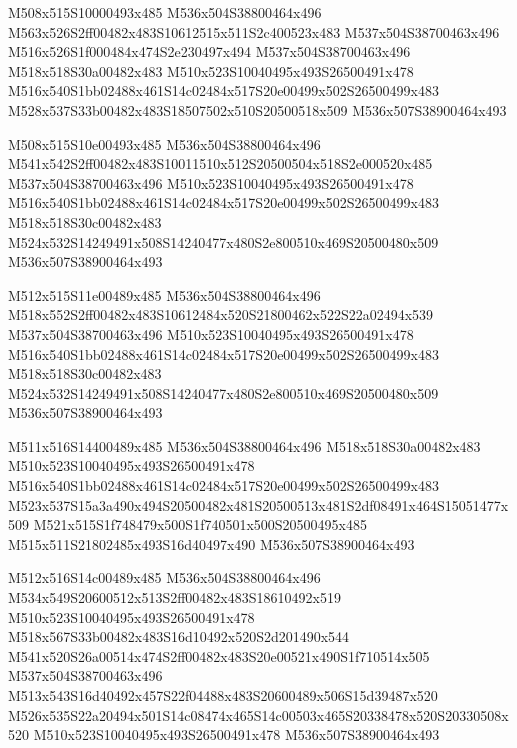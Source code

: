 \documentclass{article}
\begin{document}
\begin{multicols}{5}
\begin{center}

M508x515S10000493x485 %
M536x504S38800464x496 %
M563x526S2ff00482x483S10612515x511S2c400523x483 %
M537x504S38700463x496 %
M516x526S1f000484x474S2e230497x494 %
M537x504S38700463x496 %
M518x518S30a00482x483 %
M510x523S10040495x493S26500491x478 %
M516x540S1bb02488x461S14c02484x517S20e00499x502S26500499x483 %
M528x537S33b00482x483S18507502x510S20500518x509 %
M536x507S38900464x493 %
\vfil
\columnbreak

M508x515S10e00493x485 %
M536x504S38800464x496 %
M541x542S2ff00482x483S10011510x512S20500504x518S2e000520x485 %
M537x504S38700463x496 %
M510x523S10040495x493S26500491x478 %
M516x540S1bb02488x461S14c02484x517S20e00499x502S26500499x483 %
M518x518S30c00482x483 %
M524x532S14249491x508S14240477x480S2e800510x469S20500480x509 %
M536x507S38900464x493 %
\vfil
\columnbreak

M512x515S11e00489x485 %
M536x504S38800464x496 %
M518x552S2ff00482x483S10612484x520S21800462x522S22a02494x539 %
M537x504S38700463x496 %
M510x523S10040495x493S26500491x478 %
M516x540S1bb02488x461S14c02484x517S20e00499x502S26500499x483 %
M518x518S30c00482x483 %
M524x532S14249491x508S14240477x480S2e800510x469S20500480x509 %
M536x507S38900464x493 %
\vfil
\columnbreak

M511x516S14400489x485 %
M536x504S38800464x496 %
M518x518S30a00482x483 %
M510x523S10040495x493S26500491x478 %
M516x540S1bb02488x461S14c02484x517S20e00499x502S26500499x483 %
M523x537S15a3a490x494S20500482x481S20500513x481S2df08491x464S15051477x509 %
M521x515S1f748479x500S1f740501x500S20500495x485 %
M515x511S21802485x493S16d40497x490 %
M536x507S38900464x493 %
\vfil
\columnbreak

M512x516S14c00489x485 %
M536x504S38800464x496 %
M534x549S20600512x513S2ff00482x483S18610492x519 %
M510x523S10040495x493S26500491x478 %
M518x567S33b00482x483S16d10492x520S2d201490x544 %
M541x520S26a00514x474S2ff00482x483S20e00521x490S1f710514x505 %
M537x504S38700463x496 %
M513x543S16d40492x457S22f04488x483S20600489x506S15d39487x520 %
M526x535S22a20494x501S14c08474x465S14c00503x465S20338478x520S20330508x520 %
M510x523S10040495x493S26500491x478 %
M536x507S38900464x493 %
\vfil

\end{center}
\end{multicols}
\end{document}
